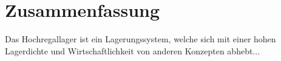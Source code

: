\section*{Zusammenfassung}
%
Das Hochregallager ist ein Lagerungssystem, welche sich mit einer hohen Lagerdichte und Wirtschaftlichkeit von anderen Konzepten abhebt...\newline


%
